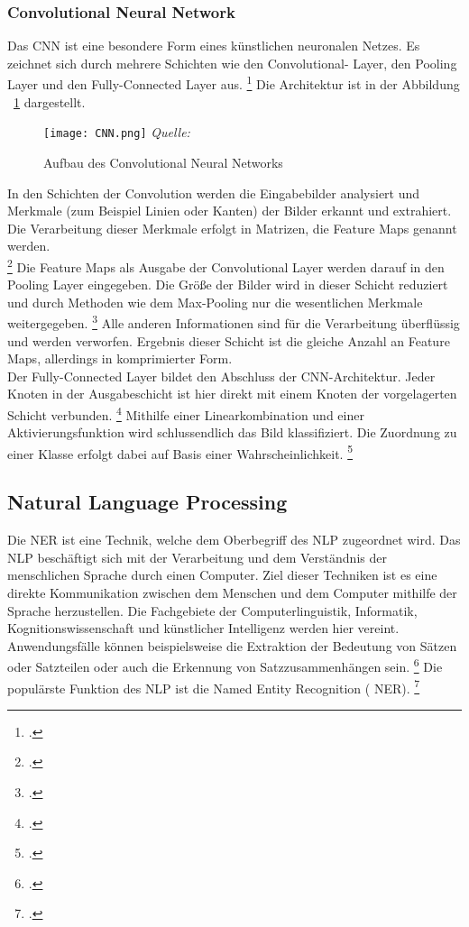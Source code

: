 \subsubsection{Convolutional Neural Network}
Das \ac{CNN} ist eine besondere Form eines künstlichen neuronalen Netzes. Es zeichnet sich durch mehrere Schichten wie den Convolutional- Layer, den Pooling Layer und den Fully-Connected Layer aus. \footcite[\vglf][]{internationalconferenceonadvancesinelectronics2018}
Die Architektur ist in der Abbildung ~\ref{fig:CNN} dargestellt.
\\

\begin{figure}[H]
    \caption{Aufbau des Convolutional Neural Networks}\label{fig:CNN}
    \texttt{[image: CNN.png]}
    \textit{Quelle:~\cite[][]{alzubaidiReviewDeepLearning2021}}
\end{figure}

In den Schichten der Convolution werden die Eingabebilder analysiert und Merkmale (zum Beispiel Linien oder Kanten) der Bilder erkannt und extrahiert.
Die Verarbeitung dieser Merkmale erfolgt in Matrizen, die Feature Maps genannt werden. \\ \footcite[\vglf][ & 328]{Goodfellow-2016}
Die Feature Maps als Ausgabe der Convolutional Layer werden darauf in den Pooling Layer eingegeben.
Die Größe der Bilder wird in dieser Schicht reduziert und durch Methoden wie dem Max-Pooling nur die wesentlichen Merkmale weitergegeben.  \footcite[\vglf][-339]{Goodfellow-2016}
Alle anderen Informationen sind für die Verarbeitung überflüssig und werden verworfen. Ergebnis dieser Schicht ist die gleiche Anzahl an Feature Maps, allerdings in komprimierter Form. \\
Der Fully-Connected Layer bildet den Abschluss der \ac{CNN}-Architektur. Jeder Knoten in der Ausgabeschicht ist hier direkt mit einem Knoten der vorgelagerten Schicht verbunden. \footcite[\vglf][]{aggarwal2021}
Mithilfe einer Linearkombination und einer Aktivierungsfunktion wird schlussendlich das Bild klassifiziert. Die Zuordnung zu einer Klasse erfolgt dabei auf Basis einer Wahrscheinlichkeit. \footcite[\vglf][]{tang2022}

\subsection{Natural Language Processing}
Die \acl{NER} ist eine Technik, welche dem Oberbegriff des \acl{NLP} zugeordnet wird. Das \ac{NLP} beschäftigt sich mit der Verarbeitung und dem Verständnis der menschlichen Sprache durch einen Computer.
Ziel dieser Techniken ist es eine direkte Kommunikation zwischen dem Menschen und dem Computer mithilfe der Sprache herzustellen. Die Fachgebiete der Computerlinguistik, Informatik, Kognitionswissenschaft und künstlicher Intelligenz werden hier vereint.
Anwendungsfälle können beispielsweise die Extraktion der Bedeutung von Sätzen oder Satzteilen oder auch die Erkennung von Satzzusammenhängen sein. \footcite[\vglf][ & 2]{deng2018} Die populärste Funktion des \ac{NLP} ist die Named Entity Recognition ( \acl{NER}). \footcite[\vglf][]{strobl2022}

